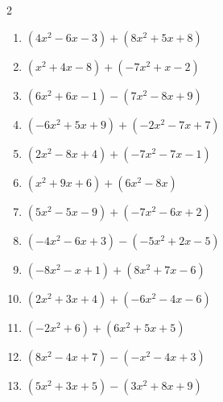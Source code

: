\begin{multicols}{2}
\begin{enumerate}

  \item $(4x^{2}-6x-3)+(8x^{2}+5x+8)$


  \item $(x^{2}+4x-8)+(-7x^{2}+x-2)$


  \item $(6x^{2}+6x-1)-(7x^{2}-8x+9)$


  \item $(-6x^{2}+5x+9)+(-2x^{2}-7x+7)$


\columnbreak %

  \item $(2x^{2}-8x+4)+(-7x^{2}-7x-1)$


  \item $(x^{2}+9x+6)+(6x^{2}-8x)$


  \item $(5x^{2}-5x-9)+(-7x^{2}-6x+2)$


  \item $(-4x^{2}-6x+3)-(-5x^{2}+2x-5)$


  \item $(-8x^{2}-x+1)+(8x^{2}+7x-6)$

        \phantom{$=6x-5$}

  \item $(2x^{2}+3x+4)+(-6x^{2}-4x-6)$


  \item $(-2x^{2}+6)+(6x^{2}+5x+5)$


  \item $(8x^{2}-4x+7)-(-x^{2}-4x+3)$


  \item $(5x^{2}+3x+5)-(3x^{2}+8x+9)$



\end{enumerate}
\end{multicols}

